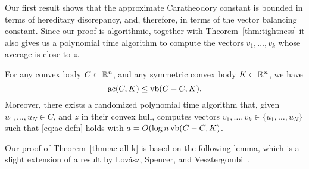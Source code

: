 Our first result shows that the approximate Caratheodory constant is
bounded in terms of hereditary discrepancy, and, therefore, in terms
of the vector balancing constant.  Since our proof is algorithmic,
together with Theorem~\ref{thm:tightness} it also gives us a
polynomial time algorithm to compute the vectors $v_1, \ldots, v_k$
whose average is close to $z$.

\begin{theorem}\label{thm:ac-all-k}
  For any convex body $C \subset {\mathbb{R}}^n$, and any symmetric convex body
  $K \subset {\mathbb{R}}^n$, we have
  \[
  \operatorname{ac}(C,K) \le \operatorname{vb}(C-C,K).
  \]
  Moreover, there exists a randomized polynomial time algorithm that,
  given $u_1, \ldots, u_N \in C$, and $z$ in their convex hull,
  computes vectors $v_1, \ldots, v_k \in \{u_1, \ldots, u_N\}$ such
  that \eqref{eq:ac-defn} holds with $a = O(\log n \operatorname{vb}(C-C, K)$.
\end{theorem}

Our proof of Theorem~\ref{thm:ac-all-k} is based on the following
lemma, which is a slight extension of a result by Lov\'asz, Spencer,
and Vesztergombi~\cite{LSV}. 

